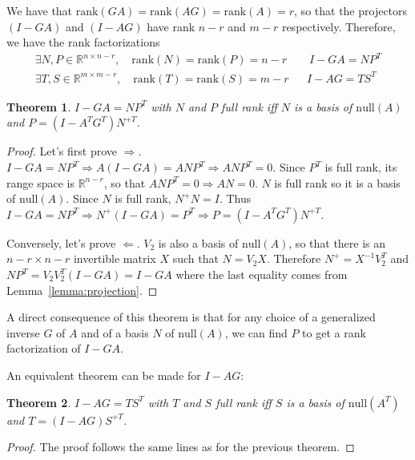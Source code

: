 \documentclass[]{article}
\newtheorem{theorem}{Theorem}[section]
\theoremstyle{definition}
\begin{document}
We have that $\mathrm{rank}(GA) = \mathrm{rank}(AG) =  \mathrm{rank}(A) =  r$, so that the projectors $(I-GA)$ and $(I-AG)$ have rank $n-r$ and $m-r$ respectively.
Therefore, we have the rank factorizations
\begin{align*}
 \exists N,P\in \mathbb{R}^{n \times n-r}, \quad \mathrm{rank}(N) = \mathrm{rank}(P) = n-r &&\ I-GA = N P^T\\
  \exists T,S\in \mathbb{R}^{m \times m-r}, \quad \mathrm{rank}(T) = \mathrm{rank}(S) = m-r && I-AG = T S^T 
\end{align*}

\begin{theorem}
\label{th:NP}
  $I-GA = N P^T$ with $N$ and $P$ full rank iff $N$ is a basis of $\mathrm{null}(A)$ and $P = (I-A^TG^T)N^{+T}$.
\end{theorem}
\begin{proof}
  Let's first prove $\Longrightarrow$.
	\newline
	$I-GA = N P^T \Longrightarrow A(I-GA) = A N P^T \Longrightarrow ANP^T=0$. Since $P^T$ is full rank, its range space is $\mathbb{R}^{n-r}$, so that $ANP^T=0 \Longrightarrow AN = 0$. $N$ is full rank so it is a basis of $\mathrm{null}(A)$.
\newline	
	Since $N$ is full rank, $N^+ N = I$. Thus $I-GA = N P^T \Longrightarrow N^+(I-GA) = P^T \Longrightarrow P = (I-A^TG^T)N^{+T}$.
	
	Conversely, let's prove $\Longleftarrow$.
  \newline
	$V_2$ is also a basis of $\mathrm{null}(A)$, so that there is an $n-r \times n-r$ invertible matrix $X$ such that $N = V_2 X$. Therefore $N^+ = X^{-1} V_2^T$ and $N P^T = V_2 V_2^T (I-GA) = I-GA$ where the last equality comes from Lemma~\ref{lemma:projection}.
\end{proof}
A direct consequence of this theorem is that for any choice of a generalized inverse $G$ of $A$ and of a basis $N$ of $\mathrm{null}(A)$, we can find $P$ to get a rank factorization of $I-GA$.

An equivalent theorem can be made for $I-AG$:
\begin{theorem}
\label{th:TS}
  $I-AG = T S^T$ with $T$ and $S$ full rank iff $S$ is a basis of $\mathrm{null}(A^T)$ and $T = (I-AG)S^{+T}$.
\end{theorem}
\begin{proof}
	The proof follows the same lines as for the previous theorem.
\end{proof}
\end{document}
